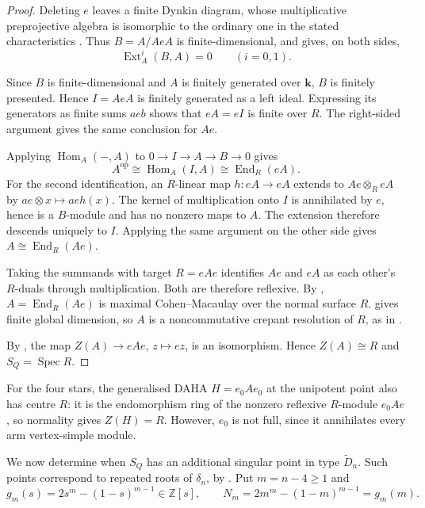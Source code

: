 \documentclass[a4paper]{amsart}
\newcommand{\kk}{\mathbf{k}}
\newcommand{\ZZ}{\mathbb{Z}}
\numberwithin{equation}{section}
\begin{document}
\begin{proof}
Deleting $e$ leaves a finite Dynkin diagram, whose multiplicative preprojective
algebra is isomorphic to the ordinary one in the stated
characteristics \cite[Theorem~1.2]{KaplanDynkin}. Thus $B=A/AeA$
is finite-dimensional, and  gives, on both sides,
\[
 \operatorname{Ext}_A^i(B,A)=0\qquad(i=0,1).
\]

Since $B$ is finite-dimensional and $A$ is finitely generated
over $\kk$, $B$ is finitely presented. Hence $I=AeA$ is finitely
generated as a left ideal. Expressing its generators as finite
sums $aeb$ shows that $eA=eI$ is finite over $R$. The right-sided
argument gives the same conclusion for $Ae$.

Applying $\operatorname{Hom}_A(-,A)$ to $0\to I\to A\to B\to0$ gives
\[
 A^{\mathrm{op}}\cong\operatorname{Hom}_A(I,A)
 \cong\operatorname{End}_R(eA).
\]
For the second identification, an $R$-linear map $h:eA\to eA$
extends to $Ae\otimes_R eA$ by $ae\otimes x\mapsto aeh(x)$.
The kernel of multiplication onto $I$ is annihilated by $e$,
hence is a $B$-module and has no nonzero maps to $A$. The
extension therefore descends uniquely to $I$. Applying the same
argument on the other side gives $A\cong\operatorname{End}_R(Ae)$.

Taking the summands with target $R=eAe$ identifies $Ae$ and $eA$
as each other's $R$-duals through multiplication. Both are
therefore reflexive. By \cite[Lemma~6.2]{KS},
$A=\operatorname{End}_R(Ae)$ is maximal Cohen--Macaulay over the
normal surface $R$.  gives finite global dimension,
so $A$ is a noncommutative crepant resolution of $R$, as in
\cite[Definition~6.1]{KS}.

By \cite[Lemma~6.13]{KS}, the map $Z(A)\to eAe$, $z\mapsto ez$,
is an isomorphism. Hence $Z(A)\cong R$ and $S_Q=\operatorname{Spec}R$.
\end{proof}

\begin{remark}
For the four stars, the generalised DAHA $H=e_0Ae_0$ at the unipotent
point also has centre $R$: it is the endomorphism ring of the nonzero
reflexive $R$-module $e_0Ae$, so normality gives $Z(H)=R$.
However, $e_0$ is not full, since it annihilates every arm vertex-simple
module.
\end{remark}

We now determine when $S_Q$ has an additional singular point in type
$\widetilde D_n$. Such points correspond to repeated roots of
$\delta_n$, by . Put $m=n-4\ge1$ and
\begin{equation}\label{eq:shaw-N}
 g_m(s)=2s^m-(1-s)^{m-1}\in\ZZ[s],\qquad
 N_m=2m^m-(1-m)^{m-1}=g_m(m).
\end{equation}
\end{document}
